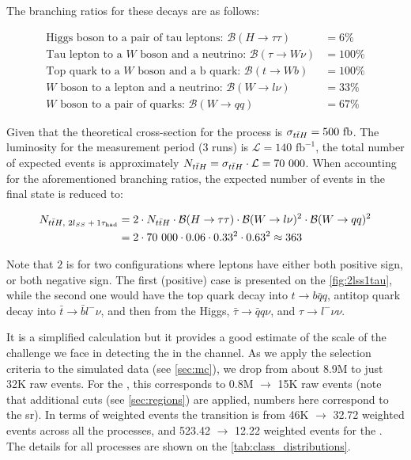The branching ratios for these decays are as follows:

\begin{align*}
    \text{Higgs boson to a pair of tau leptons: }\mathcal{B}(H \rightarrow \tau\tau)    & = 6\%   \\
    \text{Tau lepton to a $W$ boson and a neutrino: }\mathcal{B}(\tau \rightarrow W\nu) & = 100\% \\
    \text{Top quark to a $W$ boson and a b quark: }\mathcal{B}(t \rightarrow Wb)        & = 100\% \\
    \text{$W$ boson to a lepton and a neutrino: }\mathcal{B}(W \rightarrow l\nu)        & = 33\%  \\
    \text{$W$ boson to a pair of quarks: }\mathcal{B}(W \rightarrow qq)                 & = 67\%
\end{align*}

Given that the theoretical cross-section for the \tth process is $\sigma_{t\bar{t}H} = 500 \text{ fb}$. The luminosity for the
measurement period (3 runs) is ${\mathcal{L} = 140 \text{ fb}^{-1}}$, the total number of expected \tth events is
approximately ${N_\tth = \sigma_\tth \cdot \mathcal{L} = 70\ 000}$.  When accounting for the aforementioned branching
ratios, the expected number of \tth events in the \lss final state is reduced to:

\begin{align*}
    N_{\text{\ensuremath{{t\bar{t}H}}, \ensuremath{2l_{SS}+1\tau_\text{had}}}} & = 2 \cdot N_{t\bar{t}H} \cdot
    \mathcal{B}(H \rightarrow \tau\tau) \cdot
    \mathcal{B}(W \rightarrow l\nu)^2 \cdot
    \mathcal{B}(W \rightarrow qq)^2                                                            \\
                          & = 2 \cdot 70\ 000 \cdot 0.06 \cdot 0.33^2 \cdot 0.63^2 \approx 363
\end{align*}

Note that $2$ is for two configurations where leptons have either both positive sign, or both negative sign. The first
(positive) case is presented on the \autoref{fig:2lss1tau}, while the second one would have the top quark decay into
$t \rightarrow b\bar{q}q$, antitop quark decay into $\bar{t} \rightarrow \bar{b}l^-\nu$, and then from the Higgs,
$\bar{\tau} \rightarrow \bar{q}q\nu$, and $\tau \rightarrow l^-\nu\nu$.

It is a simplified calculation but it provides a good estimate of the scale of the challenge we face in detecting the
\tth in the \lss channel. As we apply the selection criteria to the simulated data (see \autoref{sec:mc}), we drop from
about 8.9M to just 32K raw events. For the \tth, this corresponds to 0.8M $\rightarrow$ 15K raw events (note that
additional cuts (see \autoref{sec:regions}) are applied, numbers here correspond to the \acrshort{sr}). In terms of
weighted events the transition is from 46K $\rightarrow$ 32.72 weighted events across all the processes, and 523.42
$\rightarrow$ 12.22 weighted events for the \tth. The details for all processes are shown on the
\autoref{tab:class_distributions}.


